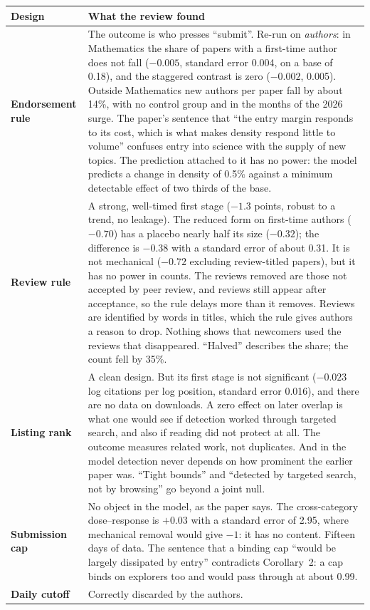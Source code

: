 \begin{center}\small
\begin{tabularx}{\textwidth}{@{}P{1.0in}L@{}}
\toprule
Design & What the review found \\
\midrule
\textbf{Endorsement rule} & The outcome is who presses ``submit''. Re-run on \emph{authors}: in Mathematics the share of papers with a first-time author does not fall ($-0.005$, standard error 0.004, on a base of 0.18), and the staggered contrast is zero ($-0.002$, 0.005). Outside Mathematics new authors per paper fall by about 14\%, with no control group and in the months of the 2026 surge. The paper's sentence that ``the entry margin responds to its cost, which is what makes density respond little to volume'' confuses entry into science with the supply of new topics. The prediction attached to it has no power: the model predicts a change in density of 0.5\% against a minimum detectable effect of two thirds of the base. \\
\textbf{Review rule} & A strong, well-timed first stage ($-1.3$ points, robust to a trend, no leakage). The reduced form on first-time authors ($-0.70$) has a placebo nearly half its size ($-0.32$); the difference is $-0.38$ with a standard error of about 0.31. It is not mechanical ($-0.72$ excluding review-titled papers), but it has no power in counts. The reviews removed are those not accepted by peer review, and reviews still appear after acceptance, so the rule delays more than it removes. Reviews are identified by words in titles, which the rule gives authors a reason to drop. Nothing shows that newcomers used the reviews that disappeared. ``Halved'' describes the share; the count fell by 35\%. \\
\textbf{Listing rank} & A clean design. But its first stage is not significant ($-0.023$ log citations per log position, standard error 0.016), and there are no data on downloads. A zero effect on later overlap is what one would see if detection worked through targeted search, and also if reading did not protect at all. The outcome measures related work, not duplicates. And in the model detection never depends on how prominent the earlier paper was. ``Tight bounds'' and ``detected by targeted search, not by browsing'' go beyond a joint null. \\
\textbf{Submission cap} & No object in the model, as the paper says. The cross-category dose--response is $+0.03$ with a standard error of 2.95, where mechanical removal would give $-1$: it has no content. Fifteen days of data. The sentence that a binding cap ``would be largely dissipated by entry'' contradicts Corollary~2: a cap binds on explorers too and would pass through at about 0.99. \\
\textbf{Daily cutoff} & Correctly discarded by the authors. \\
\bottomrule
\end{tabularx}
\end{center}

